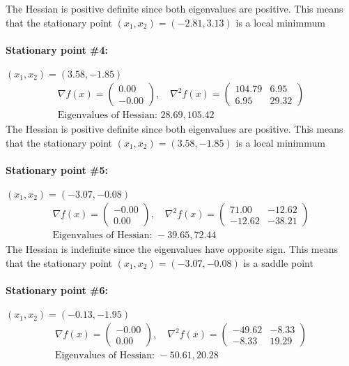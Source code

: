 The Hessian is positive definite since both eigenvalues are positive. This means that the stationary point $(x_1,x_2) = (-2.81,3.13)$ is a local minimmum\paragraph{Stationary point \#4:} $(x_1,x_2) = (3.58,-1.85)$
\begin{gather*}
\nabla f(x) = \begin{pmatrix} 0.00 \\ -0.00 \end{pmatrix}, \quad 
\nabla^2 f(x) = \begin{pmatrix} 104.79 & 6.95 \\ 6.95 & 29.32 \end{pmatrix} \\ 
\text{Eigenvalues of Hessian: } 28.69, 105.42\end{gather*}
The Hessian is positive definite since both eigenvalues are positive. This means that the stationary point $(x_1,x_2) = (3.58,-1.85)$ is a local minimmum\paragraph{Stationary point \#5:} $(x_1,x_2) = (-3.07,-0.08)$
\begin{gather*}
\nabla f(x) = \begin{pmatrix} -0.00 \\ 0.00 \end{pmatrix}, \quad 
\nabla^2 f(x) = \begin{pmatrix} 71.00 & -12.62 \\ -12.62 & -38.21 \end{pmatrix} \\ 
\text{Eigenvalues of Hessian: } -39.65, 72.44\end{gather*}
The Hessian is indefinite since the eigenvalues have opposite sign. This means that the stationary point $(x_1,x_2) = (-3.07,-0.08)$ is a saddle point\paragraph{Stationary point \#6:} $(x_1,x_2) = (-0.13,-1.95)$
\begin{gather*}
\nabla f(x) = \begin{pmatrix} -0.00 \\ 0.00 \end{pmatrix}, \quad 
\nabla^2 f(x) = \begin{pmatrix} -49.62 & -8.33 \\ -8.33 & 19.29 \end{pmatrix} \\ 
\text{Eigenvalues of Hessian: } -50.61, 20.28\end{gather*}
